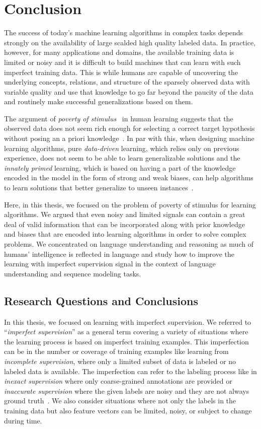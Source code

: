 \chapter{Conclusion}
The success of today's machine learning algorithms in complex tasks depends strongly on the availability of large scalded high quality labeled data. In practice, however, for many applications and domains, the available training data is limited or noisy and it is difficult to build machines that can learn with such imperfect training data.
%
This is while humans are capable of uncovering the underlying concepts, relations, and structure of the sparsely observed data with variable quality and use that knowledge to go far beyond the paucity of the data and routinely make successful generalizations based on them.

The argument of \emph{poverty of stimulus}~\citep{chomsky1980rules} in human learning suggests that the observed data does not seem rich enough for selecting a correct target hypothesis without posing an a priori knowledge~\citep{chomsky1971problems}.
%
In par with this, when designing machine learning algorithms, pure \emph{data-driven} learning, which relies only on previous experience, does not seem to be able to learn generalizable solutions and the \emph{innately primed} learning, which is based on having a part of the knowledge encoded in the model in the form of strong and weak biases, can help algorithms to learn solutions that better generalize to unseen instances~\citep{Mitchell80theneed, Mitchell:1997:ML}.

Here, in this thesis, we focused on the problem of poverty of stimulus for learning algorithms. We argued that even noisy and limited signals can contain a great deal of valid information that can be incorporated along with prior knowledge and biases that are encoded into learning algorithms in order to solve complex problems. 
We concentrated on language understanding and reasoning as much of humans' intelligence is reflected in language and study how to improve the learning with imperfect supervision signal in the context of language understanding and sequence modeling tasks.


\section{Research Questions and Conclusions}
In this thesis, we focused on learning with imperfect supervision. We referred to ``\emph{imperfect supervision}'' as a general term covering a variety of situations where the learning process is based on imperfect training examples. This imperfection can be in the number or coverage of training examples like learning from \emph{incomplete supervision}, where only a limited subset of data is labeled or no labeled data is available. The imperfection can refer to the labeling process like in \emph{inexact supervision} where only coarse-grained annotations are provided or \emph{inaccurate supervision} where the given labels are noisy and they are not always ground truth~\citep{zhou2018brief}. We also consider situations where not only the labels in the training data but also feature vectors can be limited, noisy, or subject to change during time.

